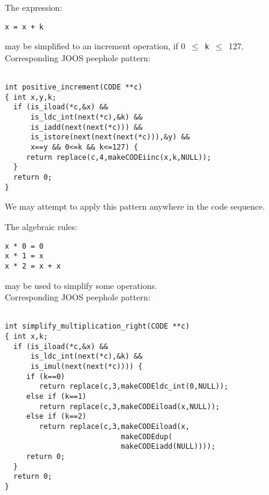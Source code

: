 \begin{slide*}
The expression:

\begin{small}
\begin{verbatim}
x = x + k
\end{verbatim}
\end{small}

may be simplified to an increment operation, if 0~$\leq$~{\tt k}~$\leq$~127.\\

Corresponding JOOS peephole pattern:

\begin{scriptsize}
\begin{verbatim}

int positive_increment(CODE **c)
{ int x,y,k;
  if (is_iload(*c,&x) &&
      is_ldc_int(next(*c),&k) &&
      is_iadd(next(next(*c))) &&
      is_istore(next(next(next(*c))),&y) &&
      x==y && 0<=k && k<=127) {
     return replace(c,4,makeCODEiinc(x,k,NULL));
  }
  return 0;
}

\end{verbatim}
\end{scriptsize}

We may attempt to apply this pattern anywhere in the code sequence.
\vfil
\end{slide*}
 
\begin{slide*}
The algebraic rules:

\begin{small}
\begin{verbatim}
x * 0 = 0
x * 1 = x
x * 2 = x + x
\end{verbatim}
\end{small}

may be used to simplify some operations.\\

Corresponding JOOS peephole pattern:
 
\begin{scriptsize}
\begin{verbatim}
 
int simplify_multiplication_right(CODE **c)
{ int x,k;
  if (is_iload(*c,&x) && 
      is_ldc_int(next(*c),&k) && 
      is_imul(next(next(*c)))) {
     if (k==0) 
        return replace(c,3,makeCODEldc_int(0,NULL));
     else if (k==1) 
        return replace(c,3,makeCODEiload(x,NULL));
     else if (k==2) 
        return replace(c,3,makeCODEiload(x,
                           makeCODEdup(
                           makeCODEiadd(NULL))));
     return 0;
  }
  return 0;
}
\end{verbatim}
\end{scriptsize}
\vfil
\end{slide*}
 
